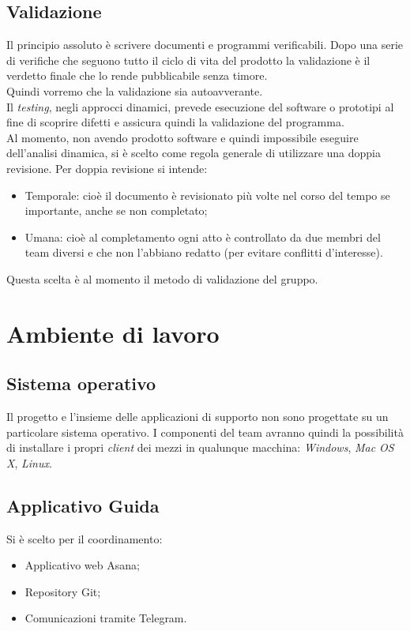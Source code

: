\documentclass[12pt,a4paper,titlepage]{article}
\begin{document}
\subsection{Validazione}
Il principio assoluto è scrivere documenti e programmi verificabili. Dopo una serie di verifiche che seguono tutto il ciclo di vita del prodotto la validazione è il verdetto finale che lo rende pubblicabile senza timore.\\
Quindi vorremo che la validazione sia  autoavverante. \\
Il \textit{testing}, negli approcci dinamici, prevede esecuzione del software o prototipi al fine di scoprire difetti e assicura quindi la validazione del programma.\\
Al momento, non avendo prodotto software e quindi impossibile eseguire dell'analisi dinamica, si è scelto come regola generale di utilizzare una doppia revisione. Per doppia revisione si intende:
\begin{itemize}
	\item Temporale: cioè il documento è revisionato più volte nel corso del tempo se importante, anche se non completato;
	\item Umana: cioè al completamento ogni atto è controllato da due membri del team diversi e che non l'abbiano redatto (per evitare conflitti d'interesse). 
\end{itemize}
Questa scelta è al momento il metodo di validazione del gruppo.
\newpage
{}
\section{Ambiente di lavoro}
\subsection{Sistema operativo}
Il progetto e l'insieme delle applicazioni di supporto non sono progettate su un particolare sistema operativo. I componenti del team avranno quindi la possibilità di installare i propri \textit{client} dei mezzi in qualunque macchina: \textit{Windows}, \textit{Mac OS X}, \textit{Linux}.
\subsection{Applicativo Guida}
Si è scelto per il coordinamento: 
\begin{itemize}
	\item Applicativo web Asana;
	\item Repository Git;
	\item Comunicazioni tramite Telegram. 
\end{itemize}
\end{document}
